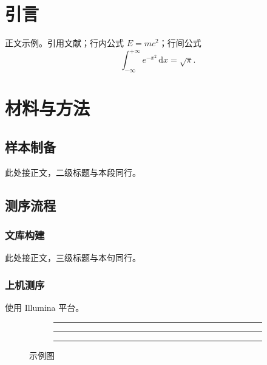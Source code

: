 \documentclass[header=true]{culscart}
\begin{document}
\maketitle

\section{引言}
正文示例。引用文献\cite{li2020}；行内公式 $E = mc^{2}$；行间公式
\begin{equation}
  \int_{-\infty}^{+\infty} e^{-x^{2}}\,\mathrm{d}x = \sqrt{\pi}.
\end{equation}

\section{材料与方法}
\subsection{样本制备}此处接正文，二级标题与本段同行。

\subsection{测序流程}
\subsubsection{文库构建}此处接正文，三级标题与本句同行。
\subsubsection{上机测序}使用 Illumina 平台。

\begin{figure}[htbp]
  \centering
  \begin{subfigure}[b]{0.32\linewidth}\centering\rule{\linewidth}{2cm}\caption{}\label{fig:a}\end{subfigure}\hfill
  \begin{subfigure}[b]{0.32\linewidth}\centering\rule{\linewidth}{2cm}\caption{}\label{fig:b}\end{subfigure}\hfill
  \begin{subfigure}[b]{0.32\linewidth}\centering\rule{\linewidth}{2cm}\caption{}\label{fig:c}\end{subfigure}
  \caption{示例图}\label{fig:demo}
\end{figure}
\end{document}
